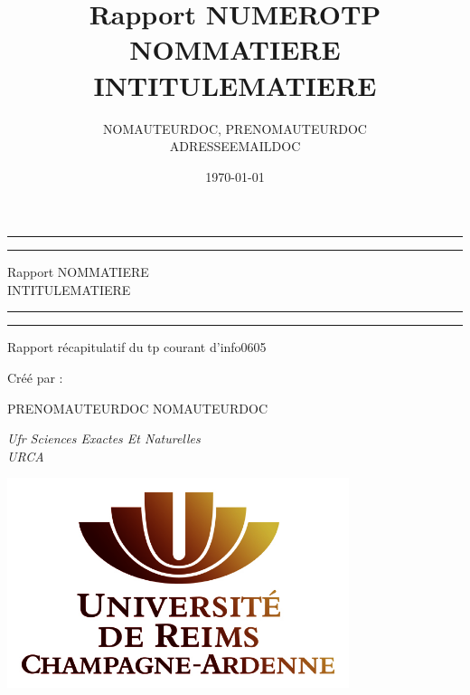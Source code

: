\documentclass[12pt]{report}
\title{\textbf{Rapport NUMEROTP NOMMATIERE\\
INTITULEMATIERE}}
\author{
	NOMAUTEURDOC, PRENOMAUTEURDOC\\
	{\small {ADRESSEEMAILDOC}}
}
\date{\today}
\begin{document}
	
	\begin{titlepage}

	\centering
	
	\scshape
	
	\vspace*{\baselineskip}

	\rule{\textwidth}{2pt}\vspace*{-\baselineskip}\vspace*{2pt} 
	\rule{\textwidth}{0.5pt}
	
	\vspace{0.75\baselineskip}
	
	{\LARGE Rapport NOMMATIERE\\ INTITULEMATIERE\\}
	
	\vspace{0.75\baselineskip}
	
	\rule{\textwidth}{0.5pt}\vspace*{-\baselineskip}\vspace{3pt} 
	\rule{\textwidth}{2pt} 
	
	\vspace{1.5\baselineskip} 
	
	Rapport récapitulatif du tp courant d'info0605
	
	\vspace*{3\baselineskip}
	
	Créé par :
	
	\vspace{0.5\baselineskip}
	{\scshape\Large PRENOMAUTEURDOC NOMAUTEURDOC}
	
	\vspace{0.5\baselineskip}
	
	\textit{Ufr Sciences Exactes Et Naturelles \\ URCA }
	
	\vfill
	
	\includegraphics[width=10cm]{images/urca.jpg}
	
	\vspace{0.5\baselineskip}
	
	\textbf{{\large \the\year}}

	\end{titlepage}
	
\end{document}
